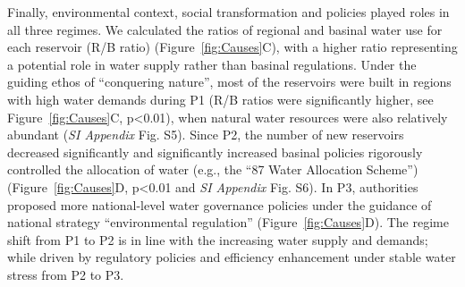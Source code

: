 Finally, environmental context, social transformation and policies played roles in all three regimes.
We calculated the ratios of regional and basinal water use for each reservoir (R/B ratio) (Figure~\ref{fig:Causes}C), with a higher ratio representing a potential role in water supply rather than basinal regulations.
Under the guiding ethos of ``conquering nature'', most of the reservoirs were built in regions with high water demands during P1 (R/B ratios were significantly higher, see Figure~\ref{fig:Causes}C, p<0.01), when natural water resources were also relatively abundant (\textit{SI Appendix} Fig. S5).
Since P2, the number of new reservoirs decreased significantly and significantly increased basinal policies rigorously controlled the allocation of water (e.g., the ``87 Water Allocation Scheme'') (Figure~\ref{fig:Causes}D, p<0.01 and \textit{SI Appendix} Fig. S6).
In P3, authorities proposed more national-level water governance policies under the guidance of national strategy ``environmental regulation'' (Figure~\ref{fig:Causes}D).
The regime shift from P1 to P2 is in line with the increasing water supply and demands; while driven by regulatory policies and efficiency enhancement under stable water stress from P2 to P3.
